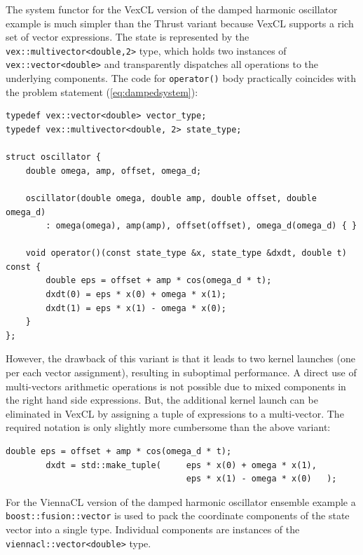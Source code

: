 \documentclass[final]{siamltex}
\newcommand{\code}[1]{\lstinline|#1|}
\newcommand{\eqref}[1]{(\ref{#1})}
\begin{document}
The system functor for the VexCL version of the damped harmonic oscillator
example is much simpler than the Thrust variant because VexCL supports a rich
set of vector expressions. The state is represented by the
\code{vex::multivector<double,2>} type, which holds two instances of
\code{vex::vector<double>} and transparently dispatches all operations to the
underlying components. The code for \code{operator()} body practically
coincides with the problem statement \eqref{eq:dampedsystem}:
\begin{lstlisting}
typedef vex::vector<double> vector_type;
typedef vex::multivector<double, 2> state_type;

struct oscillator {
    double omega, amp, offset, omega_d;

    oscillator(double omega, double amp, double offset, double omega_d)
        : omega(omega), amp(amp), offset(offset), omega_d(omega_d) { }

    void operator()(const state_type &x, state_type &dxdt, double t) const {
        double eps = offset + amp * cos(omega_d * t);
        dxdt(0) = eps * x(0) + omega * x(1);
        dxdt(1) = eps * x(1) - omega * x(0);
    }
};
\end{lstlisting}


However, the drawback of this variant is that it leads
to two kernel launches (one per each vector assignment), resulting in
suboptimal performance. A direct use of multi-vectors arithmetic
operations is not possible due to mixed components in the right hand side expressions.
But, the additional kernel launch can be eliminated in VexCL by assigning a tuple of expressions to a multi-vector.
The required notation is only slightly more cumbersome than the above variant:
\begin{lstlisting}[firstnumber=11]
        double eps = offset + amp * cos(omega_d * t);
        dxdt = std::make_tuple(     eps * x(0) + omega * x(1),
                                    eps * x(1) - omega * x(0)   );
\end{lstlisting}

For the ViennaCL version of the damped harmonic oscillator ensemble example a
\code{boost::fusion::vector} is used to pack the coordinate components of the state vector into a
single type. Individual components are instances of the
\code{viennacl::vector<double>} type.
\end{document}
